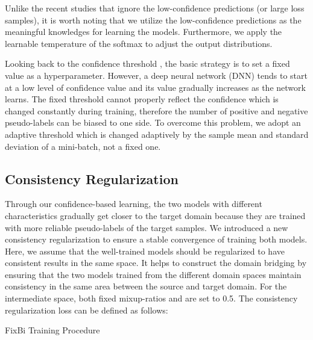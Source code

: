 \documentclass[final]{cvpr}
\begin{document}
Unlike the recent studies \cite{Co-teaching, FixMatch, MiCo2020} that ignore the low-confidence predictions (or large loss samples), it is worth noting that we utilize the low-confidence predictions as the meaningful knowledges for learning the models. Furthermore, we apply the learnable temperature of the softmax to adjust the output distributions.

Looking back to the confidence threshold , the basic strategy is to set a fixed value as a hyperparameter.
However, a deep neural network (DNN) tends to start at a low level of confidence value and its value gradually increases as the network learns. The fixed threshold cannot properly reflect the confidence which is changed constantly during training, therefore the number of positive and negative pseudo-labels can be biased to one side. To overcome this problem, we adopt an adaptive threshold which is changed adaptively by the sample mean and standard deviation of a mini-batch, not a fixed one.

\subsection{Consistency Regularization}
Through our confidence-based learning, the two models with different characteristics gradually get closer to the target domain because they are trained with more reliable pseudo-labels of the target samples. We introduced a new consistency regularization to ensure a stable convergence of training both models. Here, we assume that the well-trained models should be regularized to have consistent results in the same space. It helps to construct the domain bridging by ensuring that the two models trained from the different domain spaces maintain consistency in the same area between the source and target domain. For the intermediate space, both fixed mixup-ratios  and  are set to 0.5. The consistency regularization loss can be defined as follows:


\begin{algorithm}
\caption{FixBi Training Procedure}
\label{algo1}
\SetAlgoLined
{}
\end{algorithm}
\end{document}
